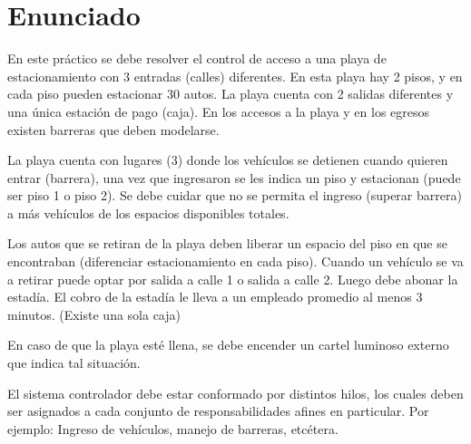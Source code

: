 \documentclass[12pt,a4paper]{article}
\renewcommand{\baselinestretch}{1} %
\begin{document}
\newpage
\renewcommand{\baselinestretch}{1}
\setlength{\parskip}{0.5em}

\section{Enunciado}
\label{enunciado}

En este práctico se debe resolver el control de acceso a una playa de estacionamiento con 3 entradas (calles) diferentes. En esta playa hay 2 pisos, y en cada piso pueden estacionar 30 autos. La playa cuenta con 2 salidas diferentes y una única estación de pago (caja). En los accesos a la playa y en los egresos existen barreras que deben modelarse.

La playa cuenta con lugares (3) donde los vehículos se detienen cuando quieren entrar (barrera), una vez que ingresaron se les indica un piso y estacionan (puede ser piso 1 o piso 2). Se debe cuidar que no se permita el ingreso (superar barrera) a más vehículos de los espacios disponibles totales.

Los autos que se retiran de la playa deben liberar un espacio del piso en que se encontraban (diferenciar estacionamiento en cada piso). Cuando un vehículo se va a retirar puede optar por salida a calle 1 o salida a calle 2.
Luego debe abonar la estadía. El cobro de la estadía le lleva a un empleado promedio al menos 3 minutos. (Existe una sola caja)

En caso de que la playa esté llena, se debe encender un cartel luminoso externo que indica tal situación.

El sistema controlador debe estar conformado por distintos hilos, los cuales deben ser asignados a cada conjunto de responsabilidades afines en particular. Por ejemplo: Ingreso de vehículos, manejo de barreras, etcétera.
\end{document}

